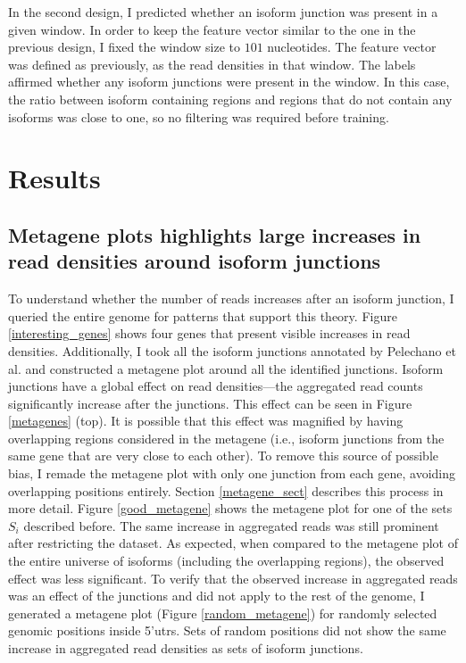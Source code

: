 \documentclass[12pt]{article}
\begin{document}
In the second design, I predicted whether an isoform junction was present in a given window. In order to keep the feature vector similar to the one in the previous design, I fixed the window size to $101$ nucleotides. The feature vector was defined as previously, as the read densities in that window. The labels affirmed whether any isoform junctions were present in the window. In this case, the ratio between isoform containing regions and regions that do not contain any isoforms was close to one, so no filtering was required before training.



\section{Results}\label{res}
\subsection{Metagene plots highlights large increases in read densities around isoform junctions}
To understand whether the number of reads increases after an isoform junction, I queried the entire genome for patterns that support this theory. Figure \ref{interesting_genes} shows four genes that present visible increases in read densities. 
Additionally, I took all the isoform junctions annotated by Pelechano et al. \cite{Pelechano2013} and constructed a metagene plot around all the identified junctions. Isoform junctions have a global effect on read densities---the aggregated read counts significantly increase after the junctions. This effect can be seen in Figure \ref{metagenes} (top). 
It is possible that this effect was magnified by having overlapping regions considered in the metagene (i.e., isoform junctions from the same gene that are very close to each other). To remove this source of possible bias, I remade the metagene plot with only one junction from each gene, avoiding overlapping positions entirely. Section \ref{metagene_sect} describes this process in more detail. Figure \ref{good_metagene} shows the metagene plot for one of the sets $S_i$ described before. The same increase in aggregated reads was still prominent after restricting the dataset. As expected, when compared to the metagene  plot of the entire universe of isoforms (including the overlapping regions), the observed effect was less significant.
To verify that the observed increase in aggregated reads was an effect of the junctions and did not apply to the rest of the genome, I generated a metagene plot (Figure \ref{random_metagene}) for randomly selected genomic positions inside 5'\acrshort{utr}s. Sets of random positions did not show the same increase in aggregated read densities as sets of isoform junctions.
\end{document}
